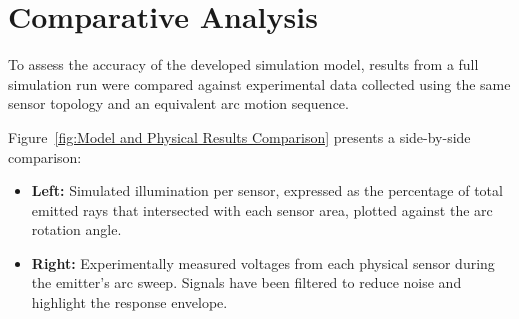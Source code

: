 \section{Comparative Analysis}

To assess the accuracy of the developed simulation model, results from a full simulation run were compared against experimental data collected using the same sensor topology and an equivalent arc motion sequence.

Figure~\ref{fig:Model and Physical Results Comparison} presents a side-by-side comparison:
\begin{itemize}
    \item \textbf{Left:} Simulated illumination per sensor, expressed as the percentage of total emitted rays that intersected with each sensor area, plotted against the arc rotation angle.
    \item \textbf{Right:} Experimentally measured voltages from each physical sensor during the emitter's arc sweep. Signals have been filtered to reduce noise and highlight the response envelope.
\end{itemize}
